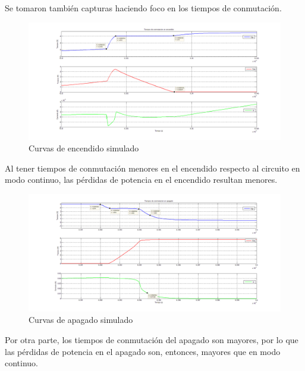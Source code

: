 \documentclass[e4_tp1_main.tex]{subfiles}
\begin{document}
Se tomaron también capturas haciendo foco en los tiempos de conmutación.

\begin{figure}[H]
\centering
\includegraphics[width=1\linewidth]{Imagenes/Punto4/tiempos_encendidoX.png}
\caption{Curvas de encendido simulado}
\end{figure}

Al tener tiempos de conmutación menores en el encendido respecto al circuito en modo continuo, las pérdidas de potencia en el encendido resultan menores.

\begin{figure}[H]
\centering
\includegraphics[width=1\linewidth]{Imagenes/Punto4/tiempos_apagadoX.png}
\caption{Curvas de apagado simulado}
\end{figure}

Por otra parte, los tiempos de conmutación del apagado son mayores, por lo que las pérdidas de potencia en el apagado son, entonces, mayores que en modo continuo.

\newpage
\end{document}

